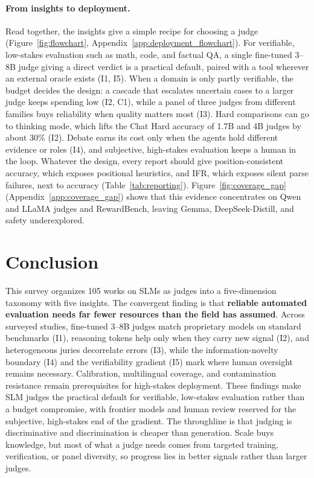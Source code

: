\documentclass[11pt]{article}
\begin{document}
\paragraph{From insights to deployment.} Read together, the insights give a simple recipe for choosing a judge (Figure~\ref{fig:flowchart}, Appendix~\ref{app:deployment_flowchart}). For verifiable, low-stakes evaluation such as math, code, and factual QA, a single fine-tuned 3--8B judge giving a direct verdict is a practical default, paired with a tool wherever an external oracle exists (I1, I5). When a domain is only partly verifiable, the budget decides the design: a cascade that escalates uncertain cases to a larger judge keeps spending low (I2, C1), while a panel of three judges from different families buys reliability when quality matters most (I3). Hard comparisons can go to thinking mode, which lifts the Chat Hard accuracy of 1.7B and 4B judges by about 30\% (I2). Debate earns its cost only when the agents hold different evidence or roles (I4), and subjective, high-stakes evaluation keeps a human in the loop. Whatever the design, every report should give position-consistent accuracy, which exposes positional heuristics, and IFR, which exposes silent parse failures, next to accuracy (Table~\ref{tab:reporting}). Figure~\ref{fig:coverage_gap} (Appendix~\ref{app:coverage_gap}) shows that this evidence concentrates on Qwen and LLaMA judges and RewardBench, leaving Gemma, DeepSeek-Distill, and safety underexplored.

\section{Conclusion}
\label{sec:conclusion}

This survey organizes 105 works on SLMs as judges into a five-dimension taxonomy with five insights. The convergent finding is that \textbf{reliable automated evaluation needs far fewer resources than the field has assumed}. Across surveyed studies, fine-tuned 3--8B judges match proprietary models on standard benchmarks (I1), reasoning tokens help only when they carry new signal (I2), and heterogeneous juries decorrelate errors (I3), while the information-novelty boundary (I4) and the verifiability gradient (I5) mark where human oversight remains necessary. Calibration, multilingual coverage, and contamination resistance remain prerequisites for high-stakes deployment. These findings make SLM judges the practical default for verifiable, low-stakes evaluation rather than a budget compromise, with frontier models and human review reserved for the subjective, high-stakes end of the gradient. The throughline is that judging is discriminative and discrimination is cheaper than generation. Scale buys knowledge, but most of what a judge needs comes from targeted training, verification, or panel diversity, so progress lies in better signals rather than larger judges.
\end{document}
